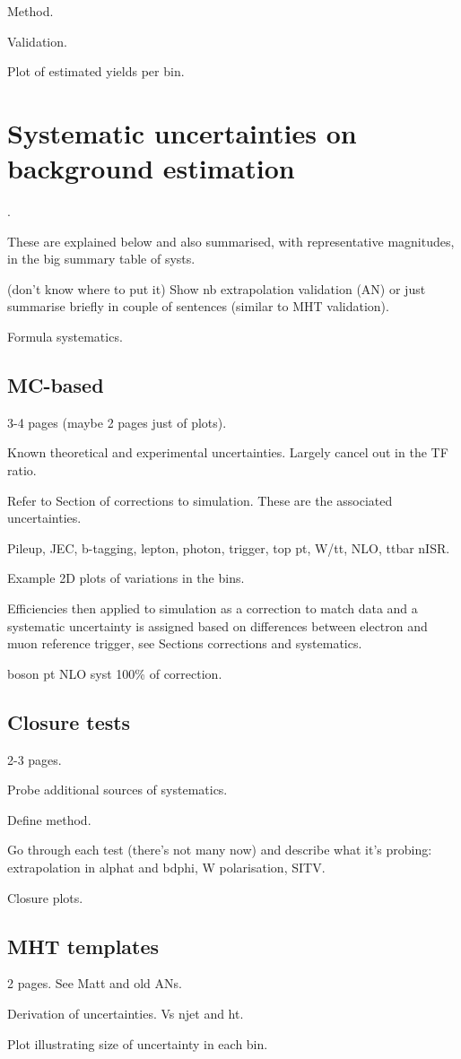 Method.

Validation.

Plot of estimated yields per bin.

\section{Systematic uncertainties on background estimation}
\label{sec:analysis-systematics}.

These are explained below and also summarised, with representative magnitudes, 
in the big summary table of systs.

(don't know where to put it)
Show nb extrapolation validation (AN) or just summarise briefly in couple of 
sentences (similar to MHT validation).

Formula systematics.

\subsection{MC-based}
\label{sec:analysis-systematics-mc}
3-4 pages (maybe 2 pages just of plots).

Known theoretical and experimental uncertainties.
Largely cancel out in the TF ratio.

Refer to Section of corrections to simulation. These are the associated 
uncertainties.

Pileup, JEC, b-tagging, lepton, photon, trigger, top pt, W/tt, NLO, ttbar nISR.

Example 2D plots of variations in the bins.

Efficiencies then applied to simulation as a correction to match data and a 
systematic uncertainty is assigned based on differences between electron and 
muon reference trigger, see Sections corrections and systematics.

boson pt NLO syst 100\% of correction.

\subsection{Closure tests}
\label{sec:analysis-systematics-data}
2-3 pages.

Probe additional sources of systematics.

Define method.

Go through each test (there's not many now) and describe what it's probing: 
extrapolation in alphat and bdphi, W polarisation, SITV.

Closure plots.

\subsection{MHT templates}
2 pages. See Matt and old ANs.

Derivation of uncertainties. Vs njet and ht.

Plot illustrating size of uncertainty in each bin.
